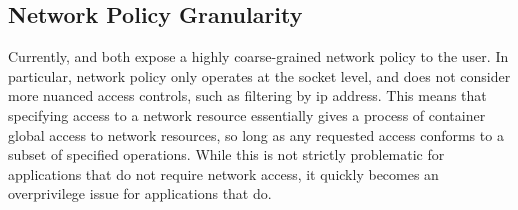 
\subsection{Network Policy Granularity}

Currently, \bpfbox{} and \bpfcontain{} both expose a highly coarse-grained network policy
to the user. In particular, network policy only operates at the socket level, and does not
consider more nuanced access controls, such as filtering by \gls{ip} address. This means
that specifying access to a network resource essentially gives a process of container
global access to network resources, so long as any requested access conforms to a subset
of specified operations. While this is not strictly problematic for applications that do
not require network access, it quickly becomes an overprivilege issue for applications
that do.

